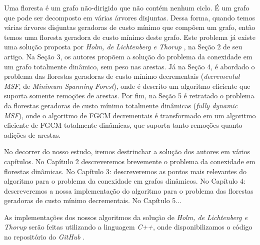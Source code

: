 Uma floresta é um grafo não-dirigido que não contém nenhum ciclo. É um grafo que pode ser decomposto em várias árvores disjuntas. Dessa forma, quando temos várias árvores disjuntas geradoras de custo mínimo que compõem um grafo, então temos uma floresta geradora de custo mínimo deste grafo. Este problema já existe uma solução proposta por \textit{Holm, de Lichtenberg e Thorup} \cite{jacob_holm}, na Seção 2 de seu artigo. Na Seção 3, os autores propõem a solução do problema da conexidade em um grafo totalmente dinâmico, sem peso nas arestas. Já na Seção 4, é abordado o problema das florestas geradoras de custo mínimo decrementais (\textit{decremental MSF}, de \textit{Minimum Spanning Forest}), onde é descrito um algoritmo eficiente que suporta somente remoções de arestas. Por fim, na Seção 5 é retratado o problema da florestas geradoras de custo mínimo totalmente dinâmicas (\textit{fully dynamic MSF}), onde o algoritmo de FGCM decrementais é transformado em um algoritmo eficiente de FGCM totalmente dinâmicas, que suporta tanto remoções quanto adições de arestas.

No decorrer do nosso estudo, iremos destrinchar a solução dos autores em vários capítulos. No Capítulo 2 descreveremos brevemente o problema da conexidade em florestas dinâmicas. No Capítulo 3: descreveremos as pontos mais relevantes do algoritmo para o problema da conexidade em grafos dinâmicos. No Capítulo 4: descreveremos a nossa implementação do algoritmo para o problema das florestas geradoras de custo mínimo decrementais. No Capítulo 5...

As implementações dos nossos algoritmos da solução de \textit{Holm, de Lichtenberg e Thorup} \cite{jacob_holm} serão feitas utilizando a linguagem \textit{C++}, onde disponibilizamos o código no repositório do \textit{GitHub} \cite{chung2025}.